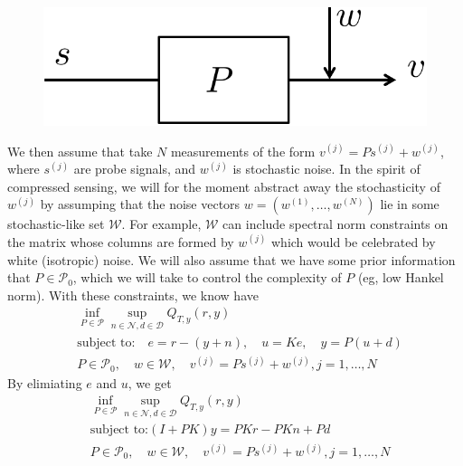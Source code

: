 \documentclass[11pt]{article} %
\newcommand{\calW}{\mathcal{W}}
\newcommand{\calD}{\mathcal{D}}
\newcommand{\calN}{\mathcal{N}}
\newcommand{\calP}{\mathcal{P}}
\theoremstyle{plain}
\theoremstyle{definition}
\theoremstyle{remark}
\newcommand{\rb}[1]{{\color{red}{ #1}}}
\begin{document}
\begin{figure}[h!]
  \centering
  \includegraphics[width=.3\linewidth]{sys3.pdf}
\end{figure}

We then assume that take $N$ measurements of the form $v^{(j)} = Ps^{(j)} + w^{(j)}$, where $s^{(j)}$ are probe signals, and $w^{(j)}$ is stochastic noise. In the spirit of compressed sensing, we will for the moment abstract away the stochasticity of $w^{(j)}$ by assumping that the noise vectors $w = (w^{(1)},\dots,w^{(N)})$ lie in some stochastic-like set $\calW$. For example, $\calW$ can include spectral norm constraints on the matrix whose columns are formed by $w^{(j)}$ which would be celebrated by white (isotropic) noise. We will also assume that we have some prior information that $P \in \calP_0$, which we will take to control the complexity of $P$ (eg, low Hankel norm). With these constraints, we know have
\begin{equation}\label{OPT2}
\begin{aligned}
&\inf_{P \in \calP} \sup_{n \in \calN,d \in \calD} Q_{T,y}(r,y)  \\
&\text{subject to:} \quad e = r - (y+n), \quad u = Ke,\quad  y = P(u+d)\\
& P \in \calP_0, \quad w \in \calW, \quad v^{(j)} = Ps^{(j)} + w^{(j)}, j = 1,\dots,N
\end{aligned}
\end{equation}
By elimiating $e$ and $u$, we get
\begin{equation}\label{OPT3}
\begin{aligned}
&\inf_{P \in \calP} \sup_{n \in \calN,d \in \calD} Q_{T,y}(r,y)  \\
&\text{subject to:}   (I+PK)y = PKr - PKn + Pd\\
& P \in \calP_0, \quad w \in \calW, \quad v^{(j)} = Ps^{(j)} + w^{(j)}, j = 1,\dots,N
\end{aligned}
\end{equation}

\rb{Alternative form: Let $y(t) = r(t) + \epsilon(t)$ and instead have a norm constraint on $\epsilon$ rather than a quadratic cost.}
\end{document}
